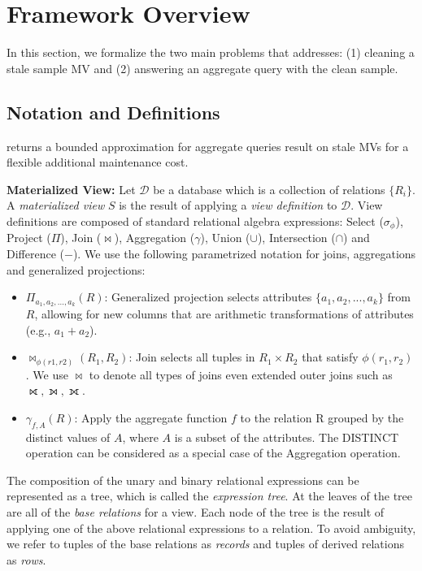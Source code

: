 \vspace{-1em}
\section{Framework Overview}\label{sec-arch}
In this section, we formalize the two main problems that \svc addresses: (1) cleaning a stale sample MV and (2) answering an aggregate query with the clean sample.

\subsection{Notation and Definitions}\label{notation}
\svc returns a bounded approximation for aggregate queries result on stale MVs for a flexible additional maintenance cost.

\noindent \textbf{Materialized View:} Let $\mathcal{D}$ be a database which is a collection of relations $\{R_i\}$. A \emph{materialized view} $S$ is the result of applying a \emph{view definition} to $\mathcal{D}$. 
View definitions are composed of standard relational algebra expressions: Select ($\sigma_{\phi}$), Project ($\Pi$), Join ($\bowtie$), Aggregation ($\gamma$), Union ($\cup$), Intersection ($\cap$) and Difference ($-$). 
We use the following parametrized notation for joins, aggregations and generalized projections:
\begin{itemize}[noitemsep] \sloppy
	\item $\Pi_{a_1,a_2,...,a_k}(R)$: Generalized projection selects attributes $\{a_1,a_2,...,a_k\}$ from $R$, allowing for new columns that are arithmetic transformations of attributes (e.g., $a_1+a_2$).
	\item $\bowtie_{\phi (r1,r2)}(R_1,R_2)$: Join selects all tuples in $R_1 \times R_2$ that satisfy $\phi (r_1,r_2)$. We use $\bowtie$ to denote all types of joins even extended outer joins such as $\rightouterjoin,\leftouterjoin,\fullouterjoin$.
	\item $\gamma_{f,A}(R)$: Apply the aggregate function $f$ to the relation R grouped by the distinct values of $A$, where $A$ is a subset of the attributes.  
	The DISTINCT operation can be considered as a special case of the Aggregation operation. 
\end{itemize}
The composition of the unary and binary relational expressions can be represented as a tree, which is called the \emph{expression tree}.
At the leaves of the tree are all of the \emph{base relations} for a view.
Each node of the tree is the result of applying one of the above relational expressions to a relation.
To avoid ambiguity, we refer to tuples of the base relations as \emph{records} and tuples of derived relations as \emph{rows}.

